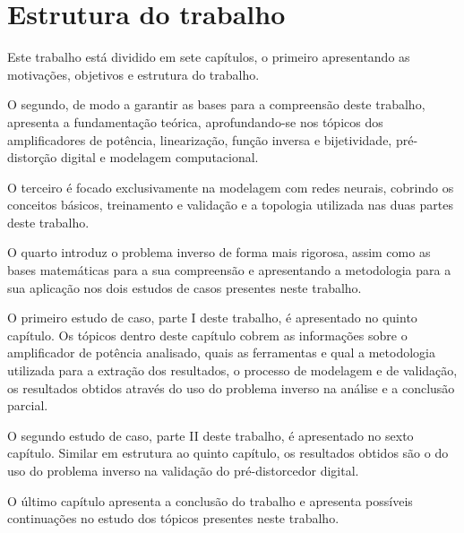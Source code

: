 \section{Estrutura do trabalho} \label{sec:introd-estrut}
Este trabalho está dividido em sete capítulos, o primeiro apresentando as motivações, objetivos e estrutura do trabalho.

O segundo, de modo a garantir as bases para a compreensão deste trabalho, apresenta a fundamentação teórica, aprofundando-se nos tópicos dos amplificadores de potência, linearização, função inversa e bijetividade, pré-distorção digital e modelagem computacional.

O terceiro é focado exclusivamente na modelagem com redes neurais, cobrindo os conceitos básicos, treinamento e validação e a topologia utilizada nas duas partes deste trabalho.

O quarto introduz o problema inverso de forma mais rigorosa, assim como as bases matemáticas para a sua compreensão e apresentando a metodologia para a sua aplicação nos dois estudos de casos presentes neste trabalho.

O primeiro estudo de caso, parte I deste trabalho, é apresentado no quinto capítulo. Os tópicos dentro deste capítulo cobrem as informações sobre o amplificador de potência analisado, quais as ferramentas e qual a metodologia utilizada para a extração dos resultados, o processo de modelagem e de validação, os resultados obtidos através do uso do problema inverso na análise e a conclusão parcial.

O segundo estudo de caso, parte II deste trabalho, é apresentado no sexto capítulo. Similar em estrutura ao quinto capítulo, os resultados obtidos são o do uso do problema inverso na validação do pré-distorcedor digital.

O último capítulo apresenta a conclusão do trabalho e apresenta possíveis continuações no estudo dos tópicos presentes neste trabalho.
